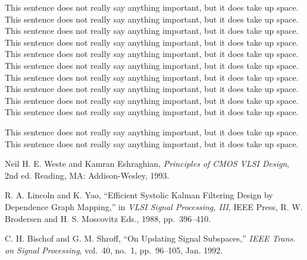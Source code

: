 \documentclass[final]{ieee}
\begin{document}
This sentence does not really say anything important, but it does take up space.
This sentence does not really say anything important, but it does take up space.
This sentence does not really say anything important, but it does take up space.
This sentence does not really say anything important, but it does take up space.
This sentence does not really say anything important, but it does take up space.
This sentence does not really say anything important, but it does take up space.
This sentence does not really say anything important, but it does take up space.
This sentence does not really say anything important, but it does take up space.
This sentence does not really say anything important, but it does take up space.
This sentence does not really say anything important, but it does take up space.

This sentence does not really say anything important, but it does take up space.
This sentence does not really say anything important, but it does take up space.





\begin{thebibliography}{99}

   Neil H. E. Weste and Kamran Eshraghian, {\it Principles
  of CMOS VLSI Design}, 2nd ed. Reading, MA: Addison-Wesley, 1993.

   R. A. Lincoln and K. Yao, ``Efficient Systolic Kalman
  Filtering Design by Dependence Graph Mapping,'' in {\it VLSI Signal
  Processing, III}, IEEE Press, R. W. Brodersen and H. S. Moscovitz Eds.,
  1988, pp.~396--410.

   C. H. Bischof and G. M. Shroff, ``On Updating Signal
  Subspaces,'' {\it IEEE Trans. on Signal Processing}, vol.~40, no.~1,
  pp.~96--105, Jan. 1992.

\end{thebibliography}
\end{document}
